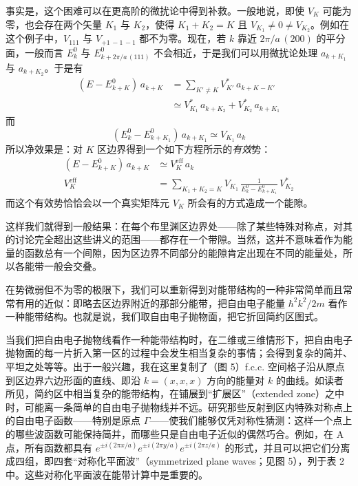 事实是，这个困难可以在更高阶的微扰论中得到补救。一般地说，即使 $V_K$ 可能为零，也会存在两个矢量 $K_1$ 与 $K_2$，使得 $K_1+K_2=K$ 且 $V_{K_1}\ne 0\ne V_{K_2}$。例如在这个例子中，$V_{111}$ 与 $V_{+1\,-1\,-1}$ 都不为零。现在，若 $k$ 靠近 $2\pi/a\,(200)$ 的平分面，一般而言 $E^0_k$ 与 $E^0_{k+2\pi/a\,(111)}$ 不会相近，于是我们可以用微扰论处理 $a_{k+K_1}$ 与 $a_{k+K_2}$。于是有
\begin{align*}
(E - E^0_{k+K})\,a_{k+K} &= \sum_{K'\ne K} V_{K'}^{*}\,a_{k+K-K'} \\
&\simeq V_{K_1}^{*}\,a_{k+K_2} + V_{K_2}^{*}\,a_{k+K_1}
\end{align*}
而
\begin{equation*}
(E^0_k - E^0_{k+K_1})\,a_{k+K_1} \simeq V_{K_1}\,a_k
\end{equation*}
所以净效果是：对 $K$ 区边界得到一个如下方程所示的\emph{有效}势：
\begin{align*}
(E - E^0_{k+K})\,a_{k+K} &\simeq V_{K}^{\mathrm{eff}}\,a_k \\
V_{K}^{\mathrm{eff}} &= \sum_{K_1+K_2=K} V_{K_1}\,\frac{1}{E^0_k - E^0_{k+K_1}}\,V_{K_2}^{*}
\end{align*}
而这个有效势恰恰会以一个真实矩阵元 $V_K$ 所会有的方式造成一个能隙。

这样我们就得到一般结果：在每个布里渊区边界处——除了某些特殊对称点，对其的讨论完全超出这些讲义的范围——都存在一个带隙。当然，这并不意味着作为能量的函数总有一个间隙，因为区边界不同部分的能隙肯定出现在不同的能量处，所以各能带一般会交叠。

在势微弱但不为零的极限下，我们可以重新得到对能带结构的一种非常简单而且常常有用的近似：即略去区边界附近的那部分能带，把自由电子能量 $\hbar^2 k^2/2m$ 看作一种能带结构。也就是说，我们取自由电子抛物面，把它折回简约区图式。

当我们把自由电子抛物线看作一种能带结构时，在二维或三维情形下，把自由电子抛物面的每一片折入第一区的过程中会发生相当复杂的事情；会得到复杂的简并、平坦之处等等。出于一般兴趣，我在这里复制了（图 5）f.c.c. 空间格子沿从原点到区边界六边形面的直线、即沿 $k=(x,x,x)$ 方向的能量对 $k$ 的曲线。如读者所见，简约区中相当复杂的能带结构，在铺展到“扩展区”（extended zone）之中时，可能离一条简单的自由电子抛物线并不远。研究那些反射到区内特殊对称点上的自由电子函数——特别是原点 $\Gamma$——使我们能够仅凭对称性猜测：这样一个点上的哪些波函数可能保持简并，而哪些只是自由电子近似的偶然巧合。例如，在 A 点，所有函数都具有 $e^{\pm i(2\pi x/a)}e^{\pm i(2\pi y/a)}e^{\pm i(2\pi z/a)}$ 的形式，并且可以把它们分离成四组，即四套“对称化平面波”（symmetrized plane waves；见图 5），列于表 2 中。这些对称化平面波在能带计算中是重要的。

